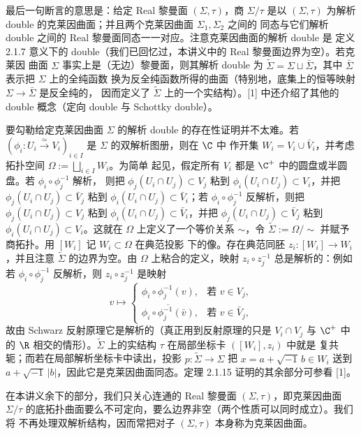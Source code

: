 最后一句断言的意思是：给定 Real 黎曼面 $(\Sigma,\tau)$，商 $\Sigma/\tau$ 是以
$(\Sigma,\tau)$ 为解析 double 的克莱因曲面；并且两个克莱因曲面 $\Sigma_1,\Sigma_2$ 之间的
同态与它们解析 double 之间的 Real 黎曼面同态一一对应。注意克莱因曲面的解析 double 是
定义 2.1.7 意义下的 double（我们已回忆过，本讲义中的 Real 黎曼面边界为空）。若克莱因
曲面 $\Sigma$ 事实上是（无边）黎曼面，则其解析 double 为
$\tilde\Sigma=\Sigma\sqcup\bar\Sigma$，其中 $\bar\Sigma$ 表示把 $\Sigma$ 上的全纯函数
换为反全纯函数所得的曲面（特别地，底集上的恒等映射 $\Sigma\to\bar\Sigma$ 是反全纯的，
因而定义了 $\tilde\Sigma$ 上的一个实结构）。[1] 中还介绍了其他的 double 概念（定向
double 与 Schottky double）。

要勾勒给定克莱因曲面 $\Sigma$ 的解析 double 的存在性证明并不太难。若
$(\phi_i:U_i\xrightarrow{\simeq}V_i)_{i\in I}$ 是 $\Sigma$ 的双解析图册，则在 $\C$ 中
作开集 $W_i=V_i\cup\bar V_i$，并考虑拓扑空间 $\Omega:=\bigsqcup_{i\in I}W_i$。为简单
起见，假定所有 $V_i$ 都是 $\C^+$ 中的圆盘或半圆盘。若 $\phi_i\circ\phi_j^{-1}$ 解析，
则把 $\phi_j(U_i\cap U_j)\subset V_j$ 粘到 $\phi_i(U_i\cap U_j)\subset V_i$，并把
$\phi_j(U_i\cap U_j)\subset\bar V_j$ 粘到 $\phi_i(U_i\cap U_j)\subset\bar V_i$；若
$\phi_i\circ\phi_j^{-1}$ 反解析，则把 $\phi_j(U_i\cap U_j)\subset V_j$ 粘到
$\phi_i(U_i\cap U_j)\subset\bar V_i$，并把 $\phi_j(U_i\cap U_j)\subset\bar V_j$ 粘到
$\phi_i(U_i\cap U_j)\subset V_i$。这就在 $\Omega$ 上定义了一个等价关系 $\sim$，令
$\tilde\Sigma:=\Omega/\sim$ 并赋予商拓扑。用 $[W_i]$ 记 $W_i\subset\Omega$ 在典范投影
下的像。存在典范同胚 $z_i:[W_i]\to W_i$，并且注意 $\tilde\Sigma$ 的边界为空。由 $\Omega$
上粘合的定义，映射 $z_i\circ z_j^{-1}$ 总是解析的：例如若 $\phi_i\circ\phi_j^{-1}$
反解析，则 $z_i\circ z_j^{-1}$ 是映射
\[
v\longmapsto
\begin{cases}
\phi_i\circ\phi_j^{-1}(v), & \text{若 } v\in V_j,\\[0.3em]
\overline{\phi_i\circ\phi_j^{-1}(\bar v)}, & \text{若 } v\in\bar V_j,
\end{cases}
\]
故由 Schwarz 反射原理它是解析的（真正用到反射原理的只是 $V_i\cap V_j$ 与 $\C^+$ 中的
$\R$ 相交的情形）。$\tilde\Sigma$ 上的实结构 $\tau$ 在局部坐标卡 $([W_i],z_i)$ 中就是
复共轭；而若在局部解析坐标卡中读出，投影 $p:\tilde\Sigma\to\Sigma$ 把
$x=a+\sqrt{-1}\,b\in W_i$ 送到 $a+\sqrt{-1}\,|b|$，因此它是克莱因曲面同态。定理 2.1.15
证明的其余部分可参看 [1]。

\begin{remark}\label{rem:2.1.16}
在本讲义余下的部分，我们只关心连通的 Real 黎曼面 $(\Sigma,\tau)$，即克莱因曲面
$\Sigma/\tau$ 的底拓扑曲面要么不可定向，要么边界非空（两个性质可以同时成立）。我们将
不再处理双解析结构，因而常把对子 $(\Sigma,\tau)$ 本身称为克莱因曲面。
\end{remark}

